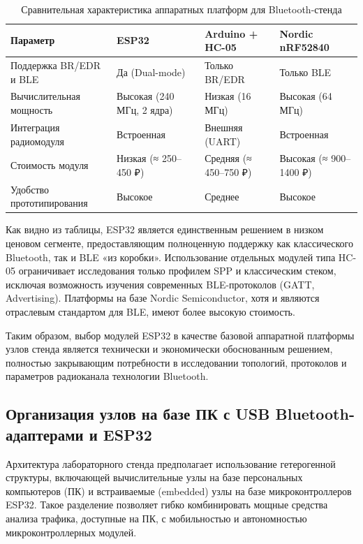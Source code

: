 \begin{table}[H]
\centering
\caption{Сравнительная характеристика аппаратных платформ для Bluetooth-стенда}
\label{tab:hardware_compare}
\renewcommand{\arraystretch}{1.3}
\begin{tabularx}{\textwidth}{|X|X|X|X|}
\hline
\textbf{Параметр} & \textbf{ESP32} & \textbf{Arduino + HC-05} & \textbf{Nordic nRF52840} \\
\hline
Поддержка BR/EDR и BLE &
Да (Dual-mode) &
Только BR/EDR &
Только BLE \\
\hline
Вычислительная мощность &
Высокая (240 МГц, 2 ядра) &
Низкая (16 МГц) &
Высокая (64 МГц) \\
\hline
Интеграция радиомодуля &
Встроенная &
Внешняя (UART) &
Встроенная \\
\hline
Стоимость модуля &
Низкая (≈ 250–450 ₽) &
Средняя (≈ 450–750 ₽) &
Высокая (≈ 900–1400 ₽) \\
\hline
Удобство прототипирования &
Высокое &
Среднее &
Высокое \\
\hline
\end{tabularx}
\end{table}

Как видно из таблицы, ESP32 является единственным решением в низком ценовом сегменте, предоставляющим полноценную поддержку как классического Bluetooth, так и BLE «из коробки». Использование отдельных модулей типа HC-05 ограничивает исследования только профилем SPP и классическим стеком, исключая возможность изучения современных BLE-протоколов (GATT, Advertising). Платформы на базе Nordic Semiconductor, хотя и являются отраслевым стандартом для BLE, имеют более высокую стоимость.

Таким образом, выбор модулей ESP32 в качестве базовой аппаратной платформы узлов стенда является технически и экономически обоснованным решением, полностью закрывающим потребности в исследовании топологий, протоколов и параметров радиоканала технологии Bluetooth.

\subsection{Организация узлов на базе ПК с USB Bluetooth-адаптерами и ESP32}

Архитектура лабораторного стенда предполагает использование гетерогенной структуры, включающей вычислительные узлы на базе персональных компьютеров (ПК) и встраиваемые (embedded) узлы на базе микроконтроллеров ESP32. Такое разделение позволяет гибко комбинировать мощные средства анализа трафика, доступные на ПК, с мобильностью и автономностью микроконтроллерных модулей.

